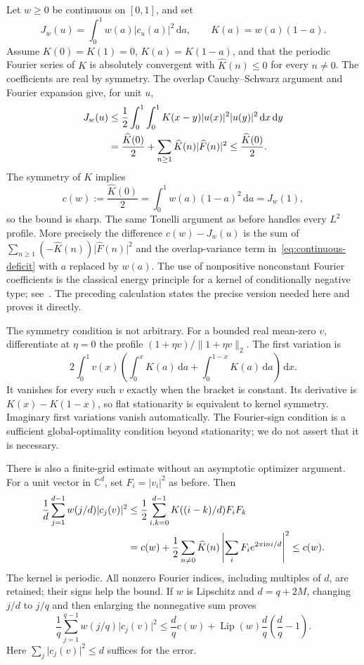 \documentclass[11pt,reqno]{amsart}
\numberwithin{equation}{section}
\newcommand{\C}{\mathbb C}
\newcommand{\dd}{\,\mathrm d}
\newcommand{\ii}{\mathrm i}
\newcommand{\norm}[1]{\lVert#1\rVert}
\newcommand{\abs}[1]{\lvert#1\rvert}
\begin{document}
Let $w\ge0$ be continuous on $[0,1]$, and set
\[
 J_w(u)=\int_0^1w(a)\abs{c_u(a)}^2\dd a,\qquad
 K(a)=w(a)(1-a).
\]
Assume $K(0)=K(1)=0$, $K(a)=K(1-a)$, and that the periodic
Fourier series of $K$ is absolutely convergent with
$\widehat K(n)\le0$ for every $n\ne0$.
The coefficients are real by symmetry. The overlap
Cauchy--Schwarz argument and Fourier expansion give, for unit $u$,
\begin{align}\label{eq:general-profile}
 J_w(u)&\le\frac12\int_0^1\int_0^1
                 K(x-y)\abs{u(x)}^2\abs{u(y)}^2\dd x\dd y\notag\\
 &=\frac{\widehat K(0)}2+
              \sum_{n\ge1}\widehat K(n)\abs{\widehat F(n)}^2
 \le\frac{\widehat K(0)}2.
\end{align}
The symmetry of $K$ implies
\begin{equation}\label{eq:profile-constant}
 c(w):=\frac{\widehat K(0)}2
       =\int_0^1w(a)(1-a)^2\dd a=J_w(1),
\end{equation}
so the bound is sharp. The same Tonelli argument as before
handles every $L^2$ profile. More precisely the difference
$c(w)-J_w(u)$ is the sum of
$\sum_{n\ge1}(-\widehat K(n))\abs{\widehat F(n)}^2$ and
the overlap-variance term in~\eqref{eq:continuous-deficit}
with $a$ replaced by $w(a)$.
The use of nonpositive nonconstant Fourier coefficients is the
classical energy principle for a kernel of conditionally negative
type; see~\cite{BCR}. The preceding calculation states the
precise version needed here and proves it directly.

The symmetry condition is not arbitrary. For a bounded real
mean-zero $v$, differentiate at $\eta=0$ the profile
$(1+\eta v)/\norm{1+\eta v}_2$. The first variation is
\[
 2\int_0^1v(x)\left(
       \int_0^xK(a)\dd a+\int_0^{1-x}K(a)\dd a\right)\dd x.
\]
It vanishes for every such $v$ exactly when the bracket is
constant. Its derivative is $K(x)-K(1-x)$, so flat
stationarity is equivalent to kernel symmetry. Imaginary
first variations vanish automatically. The Fourier-sign
condition is a sufficient global-optimality condition beyond
stationarity; we do not assert that it is necessary.

There is also a finite-grid estimate without an asymptotic
optimizer argument. For a unit vector in $\C^d$, set
$F_i=\abs{v_i}^2$ as before. Then
\begin{align}\label{eq:taper-grid}
 \frac1d\sum_{j=1}^{d-1}w(j/d)\abs{c_j(v)}^2
 &\le\frac12\sum_{i,k=0}^{d-1}K((i-k)/d)F_iF_k\notag\\
 &=c(w)+\frac12\sum_{n\ne0}\widehat K(n)
              \left|\sum_iF_i e^{2\pi\ii ni/d}\right|^2
 \le c(w).
\end{align}
The kernel is periodic. All nonzero Fourier indices, including
multiples of $d$, are retained; their signs help the bound.
If $w$ is Lipschitz and $d=q+2M$, changing $j/d$ to $j/q$
and then enlarging the nonnegative sum proves
\begin{equation}\label{eq:taper-mesh-change}
 \frac1q\sum_{j=1}^{q-1}w(j/q)\abs{c_j(v)}^2
 \le\frac dq c(w)+\operatorname{Lip}(w)\frac dq
                                      \left(\frac dq-1\right).
\end{equation}
Here $\sum_j\abs{c_j(v)}^2\le d$ suffices for the error.
\end{document}
